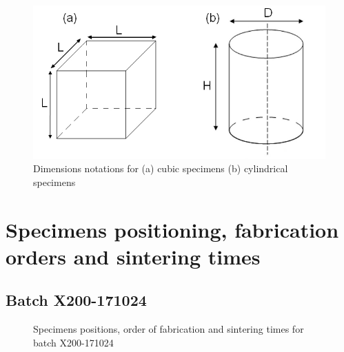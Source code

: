 
\begin{figure}[th]
\centering
\includegraphics[scale=0.58]{Images/cc}
\caption[Dimensions notations for (a) cubic specimens (b) cylindrical specimens]{Dimensions notations for (a) cubic specimens (b) cylindrical specimens}
\label{fig:cc}
\end{figure}

 
\section{Specimens positioning, fabrication orders and sintering times}
\label{mda}
\subsection{Batch X200-171024}

\begin{figure}[th]
\centering
\noindent{}
\decoRule
\caption[Specimens positions, order of fabrication and sintering times for batch X200-171024]{Specimens positions, order of fabrication and sintering times for batch X200-171024}
\label{fig:171024-cad}
\end{figure}

